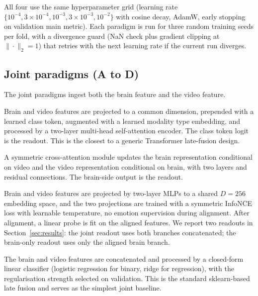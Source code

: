 \documentclass[11pt, a4paper]{article}
\begin{document}
All four use the same hyperparameter grid (learning rate $\{10^{-4}, 3\times10^{-4},
10^{-3}, 3\times10^{-3}, 10^{-2}\}$ with cosine decay, AdamW, early stopping on validation
main metric). Each paradigm is run for three random training seeds per fold, with a
divergence guard (NaN check plus gradient clipping at $\|\cdot\|_2 = 1$) that retries with
the next learning rate if the current run diverges.

\subsection{Joint paradigms (A to D)}
The joint paradigms ingest both the brain feature and the video feature.

\begin{description}[leftmargin=1.4em, itemsep=2pt]
  \item[Paradigm~A, token attention.] Brain and video features are projected to a common
        dimension, prepended with a learned class token, augmented with a learned modality
        type embedding, and processed by a two-layer multi-head self-attention encoder.
        The class token logit is the readout. This is the closest to a generic Transformer
        late-fusion design.
  \item[Paradigm~B, brain-video cross-attention.] A symmetric cross-attention module
        updates the brain representation conditional on video and the video representation
        conditional on brain, with two layers and residual connections. The brain-side
        output is the readout.
  \item[Paradigm~C, contrastive alignment.] Brain and video features are projected by
        two-layer MLPs to a shared $D = 256$ embedding space, and the two projections are
        trained with a symmetric InfoNCE loss with learnable temperature, no emotion
        supervision during alignment. After alignment, a linear probe is fit on the
        aligned features. We report two readouts in Section~\ref{sec:results}: the joint
        readout uses both branches concatenated; the brain-only readout uses only the
        aligned brain branch.
  \item[Paradigm~D, late linear fusion.] The brain and video features are concatenated
        and processed by a closed-form linear classifier (logistic regression for binary,
        ridge for regression), with the regularisation strength selected on validation.
        This is the standard sklearn-based late fusion and serves as the simplest joint
        baseline.
\end{description}
\end{document}
